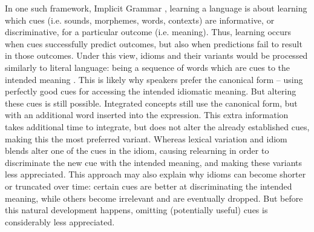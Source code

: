 \documentclass[output=paper,modfonts,nonflat]{langsci/langscibook}
\begin{document}
In one such framework, Implicit Grammar \citep{BaayenRamscar2015}, learning a language is about learning which cues (i.e. sounds, morphemes, words, contexts) are informative, or discriminative, for a particular outcome (i.e. meaning). Thus, learning occurs when cues successfully predict outcomes, but also when predictions fail to result in those outcomes. Under this view, idioms and their variants would be processed similarly to literal language: being a sequence of words which are cues to the intended meaning \citep[cf.][]{GeeraertEtAl2017}. This is likely why speakers prefer the canonical form -- using perfectly good cues for accessing the intended idiomatic meaning. But altering these cues is still possible. Integrated concepts still use the canonical form, but with an additional word inserted into the expression. This extra information takes additional time to integrate, but does not alter the already established cues, making this the most preferred variant. Whereas lexical variation and idiom blends alter one of the cues in the idiom, causing relearning in order to discriminate the new cue with the intended meaning, and making these variants less appreciated. This approach may also explain why idioms can become shorter or truncated over time: certain cues are better at discriminating the intended meaning, while others become irrelevant and are eventually dropped. But before this natural development happens, omitting (potentially useful) cues is considerably less appreciated. 




\end{document}
